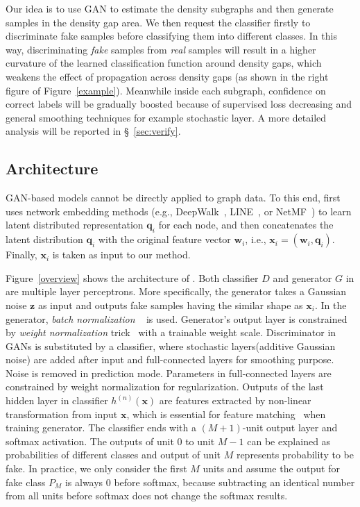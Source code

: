 Our idea is to use GAN to estimate the density subgraphs and then generate samples in the density gap area. We then request the classifier firstly to discriminate fake samples before classifying them into different classes.
In this way, discriminating \textit{fake} samples from \textit{real} samples will result in a higher curvature of the learned classification function around density gaps, which 
weakens the effect of propagation across density gaps (as shown in the right figure of Figure~\ref{example}).
Meanwhile inside each subgraph, confidence on correct labels will be gradually boosted because of supervised loss decreasing and general smoothing techniques for example stochastic layer. A more detailed analysis will be reported in \S~\ref{sec:verify}.



 
\subsection{Architecture}
\label{arch}
 	GAN-based models cannot be directly applied to graph data.
 	To this end, \smodel first uses network embedding methods (e.g., DeepWalk~\cite{Perozzi:14KDD}, LINE~\cite{tang2015line}, or NetMF~\cite{Qiu:2018WSDM}) to learn latent distributed representation $\mathbf{q}_i$ for each node, and then concatenates the latent distribution $\mathbf{q}_i$ with the original feature vector $\mathbf{w}_i$, i.e., $\mathbf{x}_i=(\mathbf{w}_i, \mathbf{q}_i)$. 
 	Finally, 
 	$\mathbf{x}_i$ is taken as input to our method.
 	
 	Figure~\ref{overview} shows the architecture of \model.
	Both classifier $D$ and generator $G$ in \smodel are multiple layer perceptrons.
	More specifically, the generator takes a Gaussian noise $\mathbf{z}$ as input and outputs fake samples having the similar shape as $\mathbf{x}_i$. In the generator, {\it batch normalization} ~\cite{ioffe2015batch} is used. 
 	Generator's output layer is constrained by {\it weight normalization} trick~\cite{salimans2016weight}  with a trainable weight scale.
    Discriminator in GANs is substituted by a classifier, where stochastic layers(additive Gaussian noise) are added after input and full-connected layers for smoothing purpose. Noise is removed in prediction mode. Parameters in full-connected layers are constrained by weight normalization for regularization. 
    Outputs of the last hidden layer in classifier $h^{(n)}(\mathbf{x})$\label{feature} are features extracted by non-linear transformation from input $\mathbf{x}$, which is essential for feature matching~\cite{salimans2016improved} when training generator. The classifier ends with a $(M+1)$-unit output layer and softmax activation. The outputs of unit $0$ to unit $M-1$ can be explained as probabilities of different classes and output of unit $M$ represents probability to be fake. In practice, we only consider the first $M$ units and assume the output for fake class $P_M$ is always 0 before softmax, because subtracting an identical number from all units before softmax does not change the softmax results.
 

